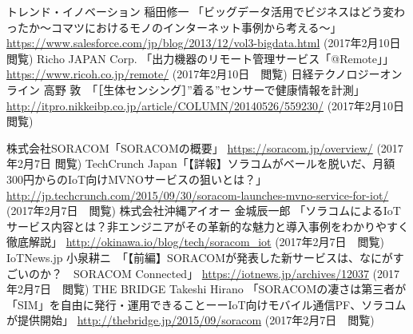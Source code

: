 
\begin{thebibliography}{99}


\begin{comment}
\bibitem{エコパ} eCoPA \url{http://ecopa.in/}
\bibitem{情報通信白書} 平成27年版 情報通信白書(総務省) 「IoTの実現に向けたアプローチと我が国ICT産業の方向性」より \url{http://www.soumu.go.jp/johotsusintokei/whitepaper/ja/h27/html/nc254150.html}
\bibitem{IoT流行語} 6割が「IoTは流行語」--エスキュービズム調査 (ZDBet Japan) \url{http://japan.zdnet.com/article/35093272/}
\bibitem{ガートナー調査} 先進テクノロジのハイプ・サイクル２０１１年　Gartner　\url{https://www.gartner.co.jp/press/html/pr20110907-01.html}
\end{comment}


 トレンド・イノベーション 稲田修一 「ビッグデータ活用でビジネスはどう変わったか〜コマツにおけるモノのインターネット事例から考える〜」 \url{https://www.salesforce.com/jp/blog/2013/12/vol3-bigdata.html} (2017年2月10日　閲覧)
 Richo JAPAN Corp. 「出力機器のリモート管理サービス「@Remote」」\url{https://www.ricoh.co.jp/remote/} (2017年2月10日　閲覧)
 日経テクノロジーオンライン 高野 敦　「［生体センシング］”着る”センサーで健康情報を計測」\url{http://itpro.nikkeibp.co.jp/article/COLUMN/20140526/559230/} (2017年2月10日　閲覧)

 株式会社SORACOM「SORACOMの概要」 \url{https://soracom.jp/overview/} (2017年2月7日 閲覧)
 TechCrunch Japan「【詳報】ソラコムがベールを脱いだ、月額300円からのIoT向けMVNOサービスの狙いとは？」 \url{http://jp.techcrunch.com/2015/09/30/soracom-launches-mvno-service-for-iot/} (2017年2月7日　閲覧)
 株式会社沖縄アイオー 金城辰一郎 「ソラコムによるIoTサービス内容とは？非エンジニアがその革新的な魅力と導入事例をわかりやすく徹底解説」 \url{http://okinawa.io/blog/tech/soracom_iot} (2017年2月7日　閲覧)
 IoTNews.jp 小泉耕ニ　「【前編】SORACOMが発表した新サービスは、なにがすごいのか？　SORACOM Connected」 \url{https://iotnews.jp/archives/12037} (2017年2月7日　閲覧)
 THE BRIDGE Takeshi Hirano 「SORACOMの凄さは第三者が「SIM」を自由に発行・運用できることーーIoT向けモバイル通信PF、ソラコムが提供開始」 \url{http://thebridge.jp/2015/09/soracom} (2017年2月7日　閲覧)
\end{thebibliography}
